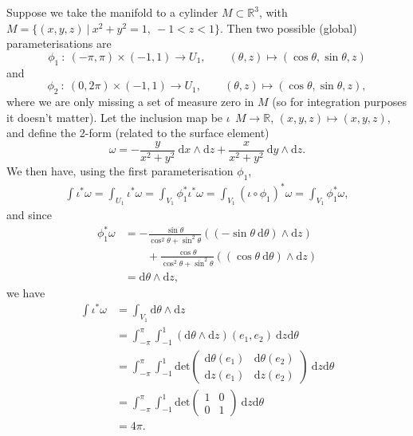 \documentclass[letter-paper]{tufte-book}
\newenvironment{example}[1][Example]{\begin{trivlist}
\item[\hskip \labelsep {\bfseries #1}]}{\end{trivlist}}
\begin{document}
\begin{example}
  Suppose we take the manifold to a cylinder $M \subset \mathbb{R}^3$, with $M = \{(x,y,z)\ |\ x^2 + y^2 = 1,\ -1<z<1\}$. Then two possible (global) parameterisations are
  \begin{equation*}
    \phi_1\ :\ (-\pi, \pi) \times (-1, 1) \to U_1,\qquad (\theta, z) \mapsto (\cos\theta, \sin\theta, z)
  \end{equation*}
  and
  \begin{equation*}
    \phi_2\ :\ (0, 2\pi) \times (-1, 1) \to U_1,\qquad (\theta, z) \mapsto (\cos\theta, \sin\theta, z),
  \end{equation*}
  where we are only missing a set of measure zero in $M$ (so for integration purposes it doesn't matter). Let the inclusion map be $\iota\: \ M \to \mathbb{R}$, $(x,y,z) \mapsto (x,y,z)$, and define the 2-form (related to the surface element)
  \begin{equation*}
    \omega = -\frac{y}{x^2 + y^2}\ \mathrm{d}x\wedge\mathrm{d}z + \frac{x}{x^2 + y^2}\ \mathrm{d}y\wedge\mathrm{d}z.
  \end{equation*}
  We then have, using the first parameterisation $\phi_1$,
  \begin{align*}
    \int \iota^* \omega = \int_{U_1} \iota^* \omega = \int_{V_1} \phi_1^* \iota^* \omega = \int_{V_1} (\iota \circ \phi_1)^* \omega = \int_{V_1} \phi_1^* \omega,
  \end{align*}
  and since
  \begin{align*}
    \phi_1^* \omega 
      &= -\frac{\sin\theta}{\cos^2\theta + \sin^2\theta}((-\sin\theta\ \mathrm{d}\theta)\wedge \mathrm{d}z) \\
      &\qquad + \frac{\cos\theta}{\cos^2\theta + \sin^2\theta}((\cos\theta\ \mathrm{d}\theta)\wedge \mathrm{d}z)\\
      &= \mathrm{d}\theta \wedge \mathrm{d}z,
  \end{align*}
  we have 
  \begin{align*}
    \int \iota^* \omega
      &= \int_{V_1} \mathrm{d}\theta \wedge \mathrm{d}z\\
      &= \int_{-\pi}^\pi \int_{-1}^1 (\mathrm{d}\theta \wedge \mathrm{d}z)(e_1, e_2)\ \mathrm{d}z\mathrm{d}\theta\\
      &= \int_{-\pi}^\pi \int_{-1}^1 \mbox{det}\begin{pmatrix} \mathrm{d}\theta(e_1) & \mathrm{d}\theta(e_2)\\ \mathrm{d}z(e_1) & \mathrm{d}z(e_2)\end{pmatrix}\ \mathrm{d}z\mathrm{d}\theta\\
      &= \int_{-\pi}^\pi \int_{-1}^1 \mbox{det}\begin{pmatrix} 1 & 0\\ 0 & 1\end{pmatrix}\ \mathrm{d}z\mathrm{d}\theta\\
      &= 4\pi.
  \end{align*}
  

\end{example}
\end{document}

